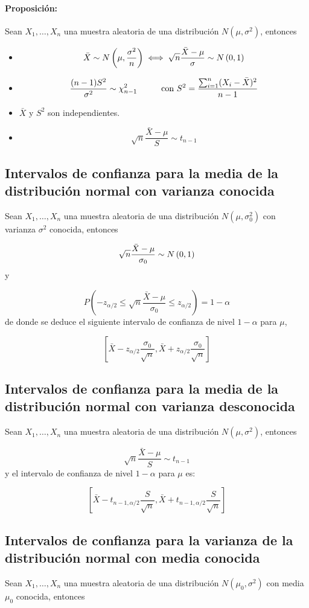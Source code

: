 \paragraph{Proposición:} Sean $X_1,\dots,X_n$ una muestra aleatoria de una distribución $N(\mu,\sigma^2)$, entonces
\begin{itemize}
\item $$\bar{X}\sim N\left(\mu,\frac{\sigma^2}{n}\right)\iff \sqrt{n}\frac{\bar{X}-\mu}{\sigma}\sim N\left(0,1\right)$$
\item
$$\frac{(n-1)S^2}{\sigma^2} \sim \chi^2_{n-1}\hspace*{1cm}\text{con } S^2 = \frac{\sum_{i=1}^{n}(X_i-\bar{X})^2}{n-1}$$

\item $\bar{X}$ y $S^2$ son independientes.
\item $$\sqrt{n}\frac{\bar{X}-\mu}{S}\sim t_{n-1}$$
\end{itemize}

\subsection{Intervalos de confianza para la media de la distribución normal con varianza conocida}
Sean $X_1,\dots,X_n$ una muestra aleatoria de una distribución $N(\mu,\sigma_0^2)$ con varianza $\sigma^2$ conocida, entonces

$$\sqrt{n}\frac{\bar{X}-\mu}{\sigma_0}\sim N\left(0,1\right)$$ y 

$$P\left(-z_{\alpha/2}\leq\sqrt{n}\frac{\bar{X}-\mu}{\sigma_0}\leq z_{\alpha/2}\right) = 1-\alpha$$
de donde se deduce el siguiente intervalo de confianza de nivel $1-\alpha$ para $\mu$,

$$\left[\bar{X}-z_{\alpha/2}\frac{\sigma_0}{\sqrt{n}},\bar{X}+z_{\alpha/2}\frac{\sigma_0}{\sqrt{n}}\right]$$

\subsection{Intervalos de confianza para la media de la distribución normal con varianza desconocida}
Sean $X_1,\dots,X_n$ una muestra aleatoria de una distribución $N(\mu,\sigma^2)$, entonces

$$\sqrt{n}\frac{\bar{X}-\mu}{S}\sim t_{n-1}$$ y  el intervalo de confianza de nivel $1-\alpha$ para $\mu$ es:

$$\left[\bar{X}-t_{n-1,\alpha/2}\frac{S}{\sqrt{n}},\bar{X}+t_{n-1,\alpha/2}\frac{S}{\sqrt{n}}\right]$$

\subsection{Intervalos de confianza para la varianza de la distribución normal con media conocida}
Sean $X_1,\dots,X_n$ una muestra aleatoria de una distribución $N(\mu_0,\sigma^2)$ con media $\mu_0$ conocida, entonces

